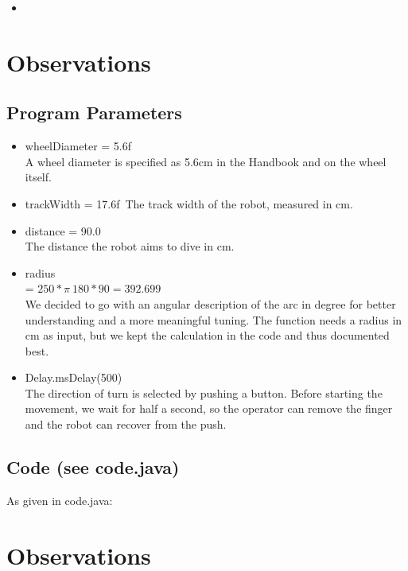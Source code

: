 \documentclass{scrartcl}
\begin{document}
\begin{itemize}
\item
\end{itemize}

\section{Observations}



\subsection{Program Parameters}
\begin{itemize}
\item wheelDiameter = 5.6f\\
A wheel diameter is specified as 5.6cm in the Handbook and on the wheel itself.

\item trackWidth = 17.6f\
The track width of the robot, measured in cm.

\item distance = 90.0\\
The distance the robot aims to dive in cm.

\item radius\\
 = $250 * \pi \ 180 * 90 = 392.699$\\
 We decided to go with an angular description of the arc in degree for better understanding and a more meaningful tuning. The function needs a radius in cm as input, but we kept the calculation in the code and thus documented best.

\item Delay.msDelay(500)\\
The direction of turn is selected by pushing a button. Before starting the movement, we wait for half a second, so the operator can remove the finger and the robot can recover from the push.
\end{itemize}


\subsection{Code (see code.java)}
As given in code.java:



\section{Observations}
\end{document}
